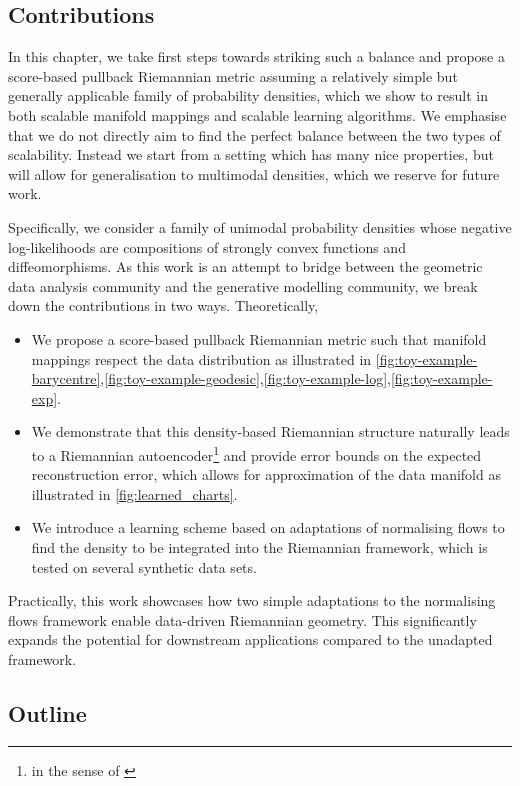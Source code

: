 \subsection{Contributions}

In this chapter, we take first steps towards striking such a balance and propose a score-based pullback Riemannian metric assuming a relatively simple but generally applicable family of probability densities, which we show to result in both scalable manifold mappings and scalable learning algorithms. We emphasise that we do not directly aim to find the perfect balance between the two types of scalability. Instead we start from a setting which has many nice properties, but will allow for generalisation to multimodal densities, which we reserve for future work.

Specifically, we consider a family of unimodal probability densities whose negative log-likelihoods are compositions of strongly convex functions and diffeomorphisms. As this work is an attempt to bridge between the geometric data analysis community and the generative modelling community, we break down the contributions in two ways.
Theoretically,
\begin{itemize}
    \item We propose a score-based pullback Riemannian metric such that manifold mappings respect the data distribution as illustrated in \ref{fig:toy-example-barycentre},\ref{fig:toy-example-geodesic},\ref{fig:toy-example-log},\ref{fig:toy-example-exp}.
    \item We demonstrate that this density-based Riemannian structure naturally leads to a Riemannian autoencoder\footnote{in the sense of \cite{diepeveen2024pulling}} and provide error bounds on the expected reconstruction error, which allows for approximation of the data manifold as illustrated in \ref{fig:learned_charts}.
    \item We introduce a learning scheme based on adaptations of normalising flows to find the density to be integrated into the Riemannian framework, which is tested on several synthetic data sets. 
\end{itemize}
Practically, this work showcases how two simple adaptations to the normalising flows framework enable data-driven Riemannian geometry. This significantly expands the potential for downstream applications compared to the unadapted framework.

\subsection{Outline}

